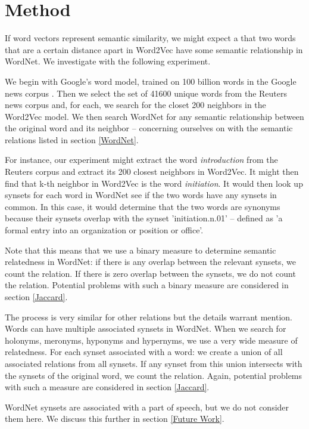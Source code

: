 \documentclass[titlepage]{article}
\begin{document}
\section{Method} \label{method}
If word vectors represent semantic similarity, we might expect a that two words that are a certain distance apart in Word2Vec have some semantic relationship in WordNet. We investigate with the following experiment. 

We begin with Google's word model, trained on 100 billion words in the Google news corpus \cite{Word2VecWebsite}. Then we select the set of 41600 unique words from the Reuters news corpus and, for each, we search for the closet 200 neighbors in the Word2Vec model. We then search WordNet for any semantic relationship between the original word and its neighbor -- concerning ourselves on with the semantic relations listed in section \ref{WordNet}.

For instance, our experiment might extract the word \textit{introduction} from the Reuters corpus and extract its 200 closest neighbors in Word2Vec. It might then find that k-th neighbor in Word2Vec is the word \textit{initiation}. It would then look up synsets for each word in WordNet see if the two words have any synsets in common. In this case, it would determine that the two words are synonyms because their synsets overlap with the synset 'initiation.n.01' -- defined as 'a formal entry into an organization or position or office'.

Note that this means that we use a binary measure to determine semantic relatedness in WordNet: if there is any overlap between the relevant synsets, we count the relation. If there is zero overlap between the synsets, we do not count the relation. Potential problems with such a binary measure are considered in section \ref{Jaccard}.

The process is very similar for other relations but the details warrant mention. Words can have multiple associated synsets in WordNet. When we search for holonyms, meronyms, hyponyms and hypernyms, we use a very wide measure of relatedness. For each synset associated with a word: we create a union of all associated relations from all synsets. If any synset from this union intersects with the synsets of the original word, we count the relation. Again, potential problems with such a measure are considered in section \ref{Jaccard}.

WordNet synsets are associated with a part of speech, but we do not consider them here. We discuss this further in section \ref{Future Work}.
\end{document}
